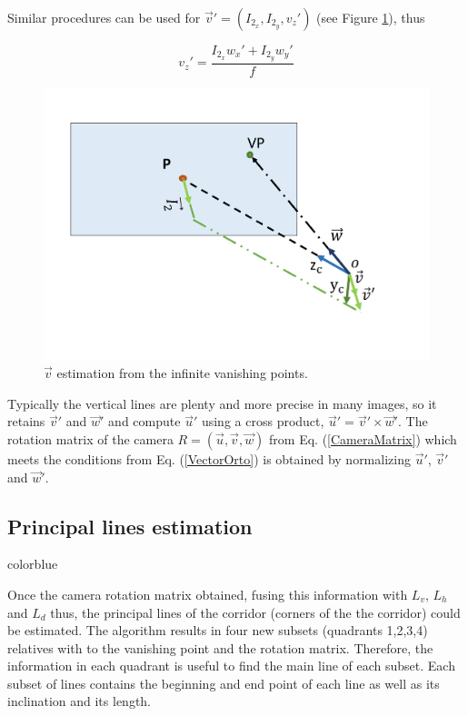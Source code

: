 Similar procedures can be used for $\vec{v}' = (I_{2_x}, I_{2_y},v_{z}')$ (see Figure \ref{fig:3_unpuntoV}), thus

\begin{equation}
	\label{PlanoV}
	v_{z}'=\frac{I_{2_x}w_{x}'+ I_{2_y}w_{y}'}{f}
\end{equation}

\begin{figure}[h]
\centering
\includegraphics[scale=0.5]{Chapter03/Images/twoInfiniteVPOneFVPV.pdf}
\caption{$\vec{v}$ estimation from  the infinite vanishing points.}
\label{fig:3_unpuntoV}
\end{figure}

Typically the vertical lines are plenty and more precise in
many images, so it retains $\vec{v}'$ and $\vec{w}'$ and compute $\vec{u}'$ using a
cross product, $\vec{u}'= \vec{v}'\times \vec{w}'$. The rotation matrix of the camera $R= (\vec{u},\vec{v},\vec{w})$ from
 Eq. (\ref{CameraMatrix}) which meets the conditions from Eq. (\ref{VectorOrto}) is
obtained by normalizing $\vec{u}'$, $\vec{v}'$ and $\vec{w}'$.


\subsection{Principal lines estimation}

color{blue}

Once the camera rotation matrix obtained, fusing this information with $ L_v $,  $ L_h $ and  $ L_d $ thus, the principal lines of the corridor (corners of the the corridor) could be estimated. The algorithm results in  four new subsets (quadrants 1,2,3,4) relatives with to the vanishing point and the rotation matrix. Therefore, the information in each quadrant
is useful to find the main line of each subset. Each subset of lines contains the beginning and end point of each line as well as its inclination and its length.  \vskip 0.2cm

